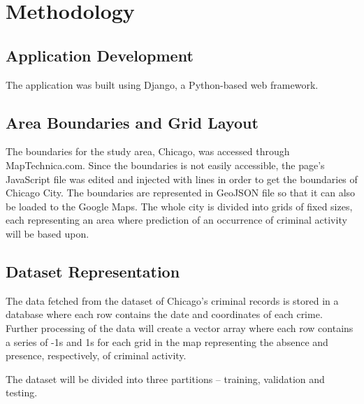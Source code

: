 
\chapter{Methodology}  %


\section{Application Development} %
    
    The application was built using Django, a Python-based web framework.


\section{Area Boundaries and Grid Layout} %

    The boundaries for the study area, Chicago, was accessed through MapTechnica.com. Since the boundaries is not easily accessible, the page’s JavaScript file was edited and injected with lines in order to get the boundaries of Chicago City. The boundaries are represented in GeoJSON file so that it can also be loaded to the Google Maps. The whole city is divided into grids of fixed sizes, each representing an area where prediction of an occurrence of criminal activity will be based upon.


\section{Dataset Representation} %

    The data fetched from the dataset of Chicago’s criminal records is stored in a database where each row  contains the date and coordinates of each crime. Further processing of the data will create a vector array where each row contains a series of -1s and 1s for each grid in the map representing the absence and presence, respectively, of criminal activity.

    The dataset will be divided into three partitions – training, validation and testing.